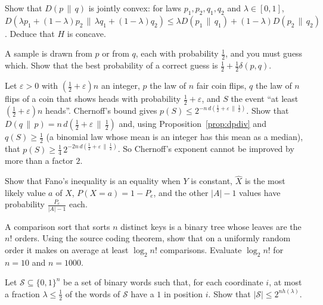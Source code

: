 \begin{exercise}[$\star\star$]\label{ex:convex}
Show that $D(p\,\|\,q)$ is jointly convex: for laws $p_1,p_2,q_1,q_2$ and $\lambda\in[0,1]$, $D(\lambda p_1+(1-\lambda)p_2\,\|\,\lambda q_1+(1-\lambda)q_2)\le\lambda D(p_1\,\|\,q_1)+(1-\lambda)D(p_2\,\|\,q_2)$. Deduce that $H$ is concave.
\end{exercise}

\begin{exercise}[$\star$]\label{ex:distinguish}
A sample is drawn from $p$ or from $q$, each with probability $\frac12$, and you must guess which. Show that the best probability of a correct guess is $\frac12+\frac12\delta(p,q)$.
\end{exercise}

\begin{exercise}[$\star\star$]\label{ex:pinskerhoeffding}
Let $\varepsilon>0$ with $(\frac12+\varepsilon)n$ an integer, $p$ the law of $n$ fair coin flips, $q$ the law of $n$ flips of a coin that shows heads with probability $\frac12+\varepsilon$, and $S$ the event ``at least $(\frac12+\varepsilon)n$ heads''. Chernoff's bound gives $p(S)\le2^{-n\,d(\frac12+\varepsilon\,\|\,\frac12)}$. Show that $D(q\,\|\,p)=n\,d(\frac12+\varepsilon\,\|\,\frac12)$ and, using Proposition~\ref{prop:dpdiv} and $q(S)\ge\frac12$ (a binomial law whose mean is an integer has this mean as a median), that $p(S)\ge\frac14\,2^{-2n\,d(\frac12+\varepsilon\,\|\,\frac12)}$. So Chernoff's exponent cannot be improved by more than a factor $2$.
\end{exercise}

\begin{exercise}[$\star\star$]\label{ex:fanosharp}
Show that Fano's inequality is an equality when $Y$ is constant, $\hat X$ is the most likely value $a$ of $X$, $P(X=a)=1-P_e$, and the other $|A|-1$ values have probability $\frac{P_e}{|A|-1}$ each.
\end{exercise}

\begin{exercise}[$\star\star$]\label{ex:sorting}
A comparison sort that sorts $n$ distinct keys is a binary tree whose leaves are the $n!$ orders. Using the source coding theorem, show that on a uniformly random order it makes on average at least $\log_2n!$ comparisons. Evaluate $\log_2 n!$ for $n=10$ and $n=1000$.
\end{exercise}

\begin{exercise}[$\star\star$]\label{ex:sparse}
Let $\mathcal S\subseteq\{0,1\}^n$ be a set of binary words such that, for each coordinate $i$, at most a fraction $\lambda\le\frac12$ of the words of $\mathcal S$ have a $1$ in position $i$. Show that $|\mathcal S|\le2^{nh(\lambda)}$.
\end{exercise}

